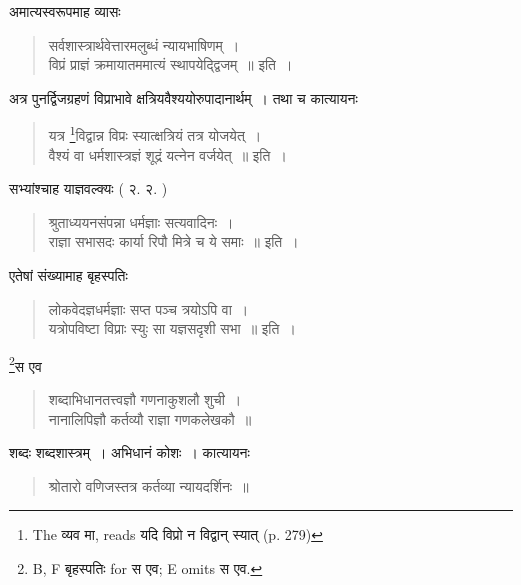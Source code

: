 \documentclass[11pt, openany]{book}
\begin{document}
\newpage
{}


अमात्यस्वरूपमाह व्यासः 

\vspace{-2mm}
\begin{quote}
{\vy सर्वशास्त्रार्थवेत्तारमलुब्धं न्यायभाषिणम्~।\\
विप्रं प्राज्ञं क्रमायातममात्यं स्थापयेद्द्विजम्~॥} इति~।
\end{quote}

अत्र पुनर्द्विजग्रहणं विप्राभावे क्षत्रियवैश्ययोरुपादानार्थम्~। तथा च कात्यायनः

\vspace{-2mm}
\begin{quote}
{\vy यत्र \renewcommand{\thefootnote}{1}\footnote{The व्यव मा, reads यदि विप्रो न विद्वान् स्यात् (p. 279)}विद्वान्न विप्रः स्यात्क्षत्रियं तत्र योजयेत्~।\\
वैश्यं वा धर्मशास्त्रज्ञं शूद्रं यत्नेन वर्जयेत्~॥} इति~।
\end{quote}

सभ्यांश्चाह याज्ञवल्क्यः ( २. २. )

\vspace{-2mm}
\begin{quote}
{\vy श्रुताध्ययनसंपन्ना धर्मज्ञाः सत्यवादिनः~।\\
राज्ञा सभासदः कार्या रिपौ मित्रे च ये समाः~॥} इति~।
\end{quote}

एतेषां संख्यामाह बृहस्पतिः

\vspace{-2mm}
\begin{quote}
{\vy लोकवेदज्ञधर्मज्ञाः सप्त पञ्च त्रयोऽपि वा~।\\
यत्रोपविष्टा विप्राः स्युः सा यज्ञसदृशी सभा~॥} इति~।
\end{quote}

\renewcommand{\thefootnote}{2}\footnote{B, F बृहस्पतिः for स एव; E omits स एव.}स एव

\vspace{-2mm}
\begin{quote}
{\vy शब्दाभिधानतत्त्वज्ञौ गणनाकुशलौ शुची~।\\
नानालिपिज्ञौ कर्तव्यौ राज्ञा गणकलेखकौ~॥}
\end{quote}

शब्दः शब्दशास्त्रम्~। अभिधानं कोशः~। कात्यायनः

\vspace{-2mm}
\begin{quote}
{\vy श्रोतारो वणिजस्तत्र कर्तव्या न्यायदर्शिनः~॥}
\end{quote}
\end{document}
